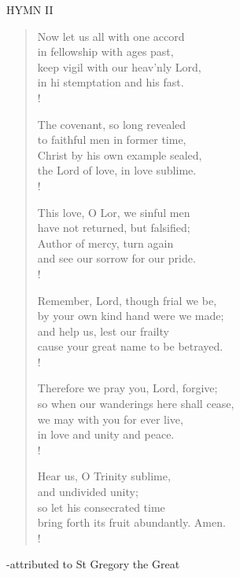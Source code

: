 \noindent\small{\uppercase{Hymn II}}\normalsize
\begin{verse}
Now let us all with one accord\\
in fellowship with ages past,\\
keep vigil with our heav'nly Lord,\\
in hi stemptation and his fast.\\!

The covenant, so long revealed \\
to faithful men in former time,\\
Christ by his own example sealed,\\
the Lord of love, in love sublime.\\!

This love, O Lor, we sinful men\\
have not returned, but falsified;\\
Author of mercy, turn again\\
and see our sorrow for our pride.\\!

Remember, Lord, though frial we be,\\
by your own kind hand were we made;\\
and help us, lest our frailty\\
cause your great name to be betrayed.\\!

Therefore we pray you, Lord, forgive;\\
so when our wanderings here shall cease,\\
we may with you for ever live,\\
in love and unity and peace.\\!

Hear us, O Trinity sublime,\\
and undivided unity;\\
so let his consecrated time\\
bring forth its fruit abundantly. Amen.\\!
\end{verse}

\begin{flushright}
\tiny -attributed to St Gregory the Great
\end{flushright}


